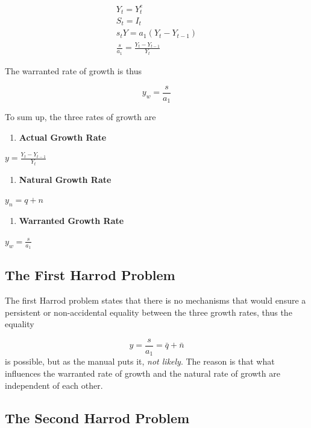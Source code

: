 \documentclass[
  letterpaper,
  DIV=11,
  numbers=noendperiod]{scrreprt}
\providecommand{\tightlist}{%
  \setlength{\itemsep}{0pt}\setlength{\parskip}{0pt}}\usepackage{longtable,booktabs,array}
\begin{document}
\[
\begin{aligned}
Y_t = Y^e_t 
\\
S_t = I_t 
\\
s_tY = a_1(Y_t - Y_{t-1}) 
\\
\frac{s}{a_1} = \frac{Y_t-Y_{t-1}}{Y_t}
\end{aligned}
\]

The warranted rate of growth is thus

\[y_w = \frac{s}{a_1}\]

To sum up, the three rates of growth are

\begin{enumerate}
\def\labelenumi{\arabic{enumi}.}
\tightlist
\item
  \textbf{Actual Growth Rate}
\end{enumerate}

\(y = \frac{Y_t-Y_{t-1}}{Y_t}\)

\begin{enumerate}
\def\labelenumi{\arabic{enumi}.}
\setcounter{enumi}{1}
\tightlist
\item
  \textbf{Natural Growth Rate}
\end{enumerate}

\(y_n = q + n\)

\begin{enumerate}
\def\labelenumi{\arabic{enumi}.}
\setcounter{enumi}{2}
\tightlist
\item
  \textbf{Warranted Growth Rate}
\end{enumerate}

\(y_w = \frac{s}{a_1}\)

\hypertarget{the-first-harrod-problem}{%
\subsection{The First Harrod Problem}\label{the-first-harrod-problem}}

The first Harrod problem states that there is no mechanisms that would
ensure a persistent or non-accidental equality between the three growth
rates, thus the equality

\[
y = \frac{s}{a_1} = \bar{q} + \bar{n}
\] is possible, but as the manual puts it, \emph{not likely}. The reason
is that what influences the warranted rate of growth and the natural
rate of growth are independent of each other.

\hypertarget{the-second-harrod-problem}{%
\subsection{The Second Harrod Problem}\label{the-second-harrod-problem}}
\end{document}

